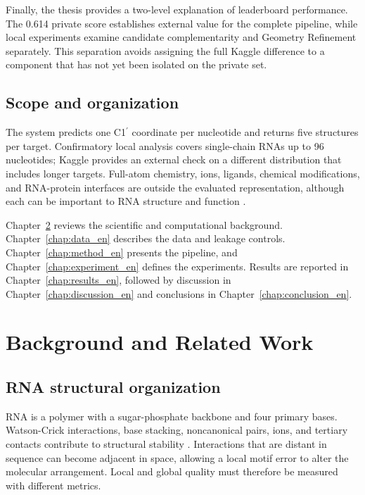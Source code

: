 \documentclass[12pt,a4paper,oneside]{report}
\newcommand{\cprime}{C1$^{\prime}$}
\begin{document}
Finally, the thesis provides a two-level explanation of leaderboard performance. The
0.614 private score establishes external value for the complete pipeline, while local
experiments examine candidate complementarity and Geometry Refinement separately. This
separation avoids assigning the full Kaggle difference to a component that has not yet
been isolated on the private set.

\section{Scope and organization}

The system predicts one \cprime{} coordinate per nucleotide and returns five structures
per target. Confirmatory local analysis covers single-chain RNAs up to 96 nucleotides;
Kaggle provides an external check on a different distribution that includes longer
targets. Full-atom chemistry, ions, ligands, chemical modifications, and RNA-protein
interfaces are outside the evaluated representation, although each can be important to
RNA structure and function \cite{butcher_tertiary,zhang_experimental_review}.

Chapter~\ref{chap:background_en} reviews the scientific and computational background.
Chapter~\ref{chap:data_en} describes the data and leakage controls.
Chapter~\ref{chap:method_en} presents the pipeline, and
Chapter~\ref{chap:experiment_en} defines the experiments. Results are reported in
Chapter~\ref{chap:results_en}, followed by discussion in
Chapter~\ref{chap:discussion_en} and conclusions in Chapter~\ref{chap:conclusion_en}.

\chapter{Background and Related Work}
\label{chap:background_en}

\section{RNA structural organization}

RNA is a polymer with a sugar-phosphate backbone and four primary bases. Watson-Crick
interactions, base stacking, noncanonical pairs, ions, and tertiary contacts contribute
to structural stability \cite{tinoco_folding,butcher_tertiary}. Interactions that are
distant in sequence can become adjacent in space, allowing a local motif error to alter
the molecular arrangement. Local and global quality must therefore be measured with
different metrics.
\end{document}
